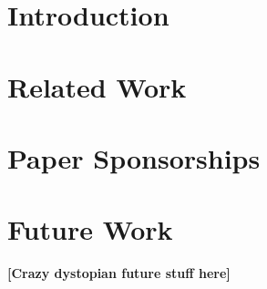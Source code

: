 \documentclass{article}
\newcommand{\todo}[1]
{{\bf\color{red}[#1]}}
\begin{document}
\section{Introduction}

\section{Related Work}



\section{Paper Sponsorships}

\section{Future Work}
\todo{Crazy dystopian future stuff here}
\end{document}
